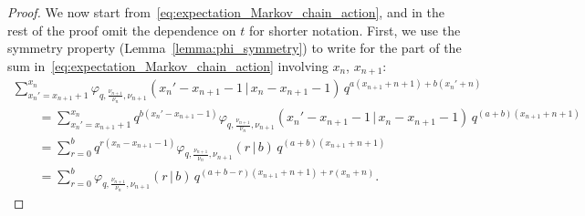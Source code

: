 \documentclass[11pt]{article}
\numberwithin{equation}{section}
\numberwithin{equation}{section}
\begin{document}
\begin{proof}
	We now start from~\eqref{eq:expectation_Markov_chain_action}, and
	in the rest of the proof omit the dependence on $t$ for shorter notation.
	First, we use the symmetry property (Lemma~\ref{lemma:phi_symmetry})
	to write for the part of the sum in~\eqref{eq:expectation_Markov_chain_action}
	involving $x_n$, $x_{n+1}$:
	\begin{gather}
	\sum_{x_n'=x_{n+1}+1}^{x_n}
	\varphi_{q,\frac{\nu_{n+1}}{\nu_n},\nu_{n+1}}(x_n'-x_{n+1}-1\,|\, x_n-x_{n+1}-1)
	\,q^{a(x_{n+1}+n+1)+b(x_n'+n)}\nonumber
	\\[-.5ex] \qquad
{}=	\sum_{x_n'=x_{n+1}+1}^{x_n}	\!\!\! q^{b(x_n'-x_{n+1}-1)}
	\varphi_{q,\frac{\nu_{n+1}}{\nu_n},\nu_{n+1}}
	(x_n'-x_{n+1}-1\,|\, x_n-x_{n+1}-1)	\,q^{(a+b)(x_{n+1}+n+1)}\nonumber
	\\[-.5ex] \qquad
{}=	\sum_{r=0}^{b}	q^{r(x_n-x_{n+1}-1)}	\varphi_{q,\frac{\nu_{n+1}}{\nu_n},\nu_{n+1}}
	(r\,|\, b)	\,q^{(a+b)(x_{n+1}+n+1)}\nonumber
	\\[-.5ex] \qquad
{}=	\sum_{r=0}^{b}	\varphi_{q,\frac{\nu_{n+1}}{\nu_n},\nu_{n+1}}
	(r\,|\, b)	\,q^{(a+b-r)(x_{n+1}+n+1)+r(x_n+n)}.
	\label{eq:duality_computation_for_ptransition}
	\end{gather}


\end{proof}
\end{document}
